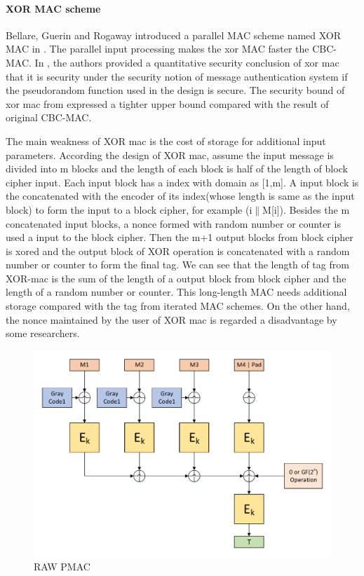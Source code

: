 \documentclass{article}
\begin{document}
\paragraph{XOR MAC scheme}
Bellare, Guerin and Rogaway introduced a parallel MAC scheme named XOR MAC in \cite{xor-mac}. 
The parallel input processing makes the xor MAC faster the CBC-MAC. 
In \cite{xor-mac}, the authors provided a quantitative security conclusion of xor mac that it is security under the security notion of message authentication system if the pseudorandom function used in the design is secure. The security bound of xor mac from \cite{xor-mac} expressed a tighter upper bound compared with the result of original CBC-MAC. 

The main weakness of XOR mac is the cost of storage for additional input parameters. According the design of XOR mac, assume the input message is divided into m blocks and the length of each block is half of the length of block cipher input. Each input block has a index with domain as [1,m]. A input block is the concatenated with the encoder of its index(whose length is same as the input block) to form the input to a block cipher, for example (i$\|$M[i]). Besides the m concatenated input blocks, a nonce formed with random number or counter is used a input to the block cipher. Then the m+1 output blocks from block cipher is xored and the output block of XOR operation is concatenated with a random number or counter to form the final tag. 
We can see that the length of tag from XOR-mac is the sum of the length of a output block from block cipher and the length of a random number or counter. This long-length MAC needs additional storage compared with the tag from iterated MAC schemes. 
On the other hand, the nonce maintained by the user of XOR mac is regarded a disadvantage by some researchers.
\begin{figure}[htbp]
\centering
\includegraphics[scale=0.5]{./diagrams/PMAC.pdf}
\caption{RAW PMAC}
\label{fig:PMAC}
\end{figure}
\end{document}
